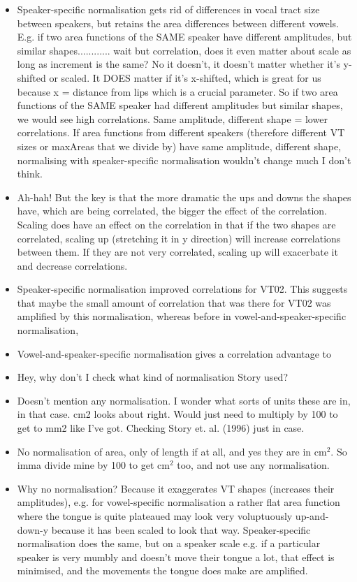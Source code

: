 \documentclass{article}
\begin{document}
\begin{itemize}
\begin{itemize}
\begin{itemize}
\begin{itemize}
                \item Speaker-specific normalisation gets rid of differences in vocal tract size between speakers, but retains the area differences between different vowels. E.g. if two area functions of the SAME speaker have different amplitudes, but similar shapes............ wait but correlation, does it even matter about scale as long as increment is the same? No it doesn't, it doesn't matter whether it's y-shifted or scaled. It DOES matter if it's x-shifted, which is great for us because x = distance from lips which is a crucial parameter. So if two area functions of the SAME speaker had different amplitudes but similar shapes, we would see high correlations. Same amplitude, different shape = lower correlations. If area functions from different speakers (therefore different VT sizes or maxAreas that we divide by) have same amplitude, different shape, normalising with speaker-specific normalisation wouldn't change much I don't think.
                \item Ah-hah! But the key is that the more dramatic the ups and downs the shapes have, which are being correlated, the bigger the effect of the correlation. Scaling does have an effect on the correlation in that if the two shapes are correlated, scaling up (stretching it in y direction) will increase correlations between them. If they are not very correlated, scaling up will exacerbate it and decrease correlations.
                \item Speaker-specific normalisation improved correlations for VT02. This suggests that maybe the small amount of correlation that was there for VT02 was amplified by this normalisation, whereas before in vowel-and-speaker-specific normalisation, 
                \item Vowel-and-speaker-specific normalisation gives a correlation advantage to 
                \item Hey, why don't I check what kind of normalisation Story used?
                \item Doesn't mention any normalisation. I wonder what sorts of units these are in, in that case. cm2 looks about right. Would just need to multiply by 100 to get to mm2 like I've got. Checking Story et. al. (1996) just in case. 
                \item No normalisation of area, only of length if at all, and yes they are in cm$^2$. So imma divide mine by 100 to get cm$^2$ too, and not use any normalisation.
                \item Why no normalisation? Because it exaggerates VT shapes (increases their amplitudes), e.g. for vowel-specific normalisation a rather flat area function where the tongue is quite plateaued may look very voluptuously up-and-down-y because it has been scaled to look that way. Speaker-specific normalisation does the same, but on a speaker scale e.g. if a particular speaker is very mumbly and doesn't move their tongue a lot, that effect is minimised, and the movements the tongue does make are amplified.

\end{itemize}
\end{itemize}
\end{itemize}
\end{itemize}
\end{document}
